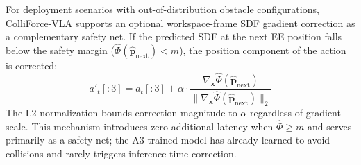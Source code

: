 For deployment scenarios with out-of-distribution obstacle configurations, ColliForce-VLA supports an optional workspace-frame SDF gradient correction as a complementary safety net. If the predicted SDF at the next EE position falls below the safety margin ($\hat{\Phi}(\hat{\mathbf{p}}_\mathrm{next}) < m$), the position component of the action is corrected:
\begin{equation}\label{eq:inference_correction}
a'_t[:3] = a_t[:3] + \alpha \cdot \frac{\nabla_{\mathbf{x}} \hat{\Phi}(\hat{\mathbf{p}}_\mathrm{next})}{\|\nabla_{\mathbf{x}} \hat{\Phi}(\hat{\mathbf{p}}_\mathrm{next})\|_2}
\end{equation}
The L2-normalization bounds correction magnitude to $\alpha$ regardless of gradient scale. This mechanism introduces zero additional latency when $\hat{\Phi} \geq m$ and serves primarily as a safety net; the A3-trained model has already learned to avoid collisions and rarely triggers inference-time correction.
